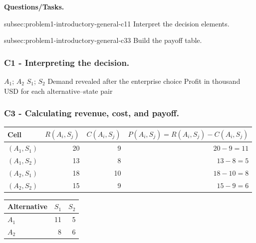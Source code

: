 \textbf{Questions/Tasks.}
\begin{enumerate}
	\CriterionTask
	{subsec:problem1-introductory-general-c1}{1}
	{Interpret the decision elements.}
	
	\CriterionTask
	{subsec:problem1-introductory-general-c3}{3}
	{Build the payoff table.}
\end{enumerate}

\subsubsection*{C1 - Interpreting the decision.}
\label{subsec:problem1-introductory-general-c1}

\DecisionElementsTable
{\(A_1\); \(A_2\)}
{\(S_1\); \(S_2\)}
{Demand revealed after the enterprise choice}
{Profit in thousand USD for each alternative--state pair}


\subsubsection*{C3 - Calculating revenue, cost, and payoff.}
\label{subsec:problem1-introductory-general-c3}

\begin{center}
	\small
	\begin{tabular}{lrrr}
		\toprule
		Cell
		& \(R(A_i,S_j)\)
		& \(C(A_i,S_j)\)
		& \(P(A_i,S_j)=R(A_i,S_j)-C(A_i,S_j)\) \\
		\midrule
		\((A_1,S_1)\) & 20 & 9  & \(20-9=11\) \\
		\((A_1,S_2)\) & 13 & 8  & \(13-8=5\) \\
		\((A_2,S_1)\) & 18 & 10 & \(18-10=8\) \\
		\((A_2,S_2)\) & 15 & 9  & \(15-9=6\) \\
		\bottomrule
	\end{tabular}
\end{center}

\begin{center}
	\begin{tabular}{lrr}
		\toprule
		Alternative & \(S_1\) & \(S_2\) \\
		\midrule
		\(A_1\) & 11 & 5 \\
		\(A_2\) & 8  & 6 \\
		\bottomrule
	\end{tabular}
\end{center}

